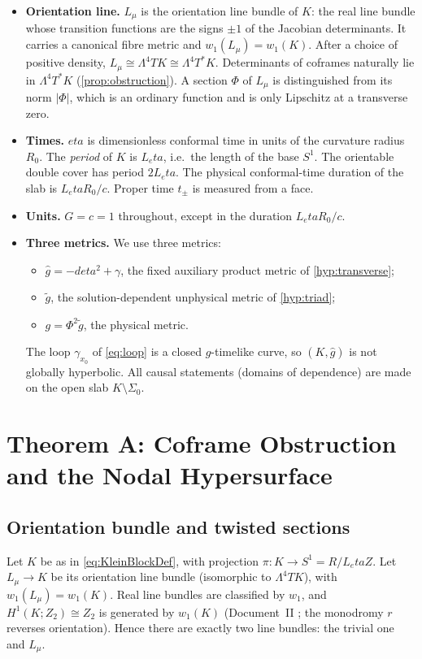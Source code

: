 \documentclass[11pt]{article}
\theoremstyle{canonmath}
\theoremstyle{canonpostulate}
\theoremstyle{canonproposition}
\theoremstyle{canonmath}
\theoremstyle{canonproposition}
\providecommand{\Lmu}{\mathcal{L}_\mu}
\providecommand{\Klein}{\mathcal{K}}
\providecommand{\R}{\mathbb{R}}
\providecommand{\Z}{\mathbb{Z}}
\providecommand{\Ztwo}{\mathbb{Z}_2}
\def\mathbb#1{#1}%
\def\mathcal#1{#1}%
\def\eta{eta}%
\begin{document}
\begin{itemize}
\item \textbf{Orientation line.} $\Lmu$ is the orientation line bundle of $\Klein$: the real line bundle whose transition functions are the signs $\pm1$ of the Jacobian determinants. It carries a canonical fibre metric and $w_1(\Lmu) = w_1(\Klein)$. After a choice of positive density, $\Lmu\cong\Lambda^4T\Klein\cong\Lambda^4T^*\Klein$. Determinants of coframes naturally lie in $\Lambda^4T^*\Klein$ (\cref{prop:obstruction}). A section $\Phi$ of $\Lmu$ is distinguished from its norm $|\Phi|$, which is an ordinary function and is only Lipschitz at a transverse zero.
\item \textbf{Times.} $\eta$ is dimensionless conformal time in units of the curvature radius $R_0$. The \emph{period} of $\Klein$ is $L_\eta$, i.e.\ the length of the base $S^1$. The orientable double cover has period $2L_\eta$. The physical conformal-time duration of the slab is $L_\eta R_0/c$. Proper time $t_\pm$ is measured from a face.
\item \textbf{Units.} $G = c = 1$ throughout, except in the duration $L_\eta R_0/c$.
\item \textbf{Three metrics.} We use three metrics:
  \begin{itemize}
  \item $\hat g = -d\eta^2+\gamma$, the fixed auxiliary product metric of \ref{hyp:transverse};
  \item $\tilde g$, the solution-dependent unphysical metric of \ref{hyp:triad};
  \item $g = \Phi^2\tilde g$, the physical metric.
  \end{itemize}
  The loop $\gamma_{x_0}$ of \eqref{eq:loop} is a closed $\hat g$-timelike curve, so $(\Klein,\hat g)$ is not globally hyperbolic. All causal statements (domains of dependence) are made on the open slab $\Klein\setminus\Sigma_0$.
\end{itemize}

\section{Theorem A: Coframe Obstruction and the Nodal Hypersurface}
\label{sec:A}

\subsection{Orientation bundle and twisted sections}

Let $\Klein$ be as in \eqref{eq:KleinBlockDef}, with projection $\pi:\Klein \to S^1 = \R/L_\eta\Z$. Let $\Lmu\to\Klein$ be its orientation line bundle (isomorphic to $\Lambda^4 T\Klein$), with $w_1(\Lmu) = w_1(\Klein)$. Real line bundles are classified by $w_1$, and $H^1(\Klein;\Ztwo) \cong \Ztwo$ is generated by $w_1(\Klein)$ (Document~II \cite{DocII}; the monodromy $r$ reverses orientation). Hence there are exactly two line bundles: the trivial one and $\Lmu$.
\end{document}
